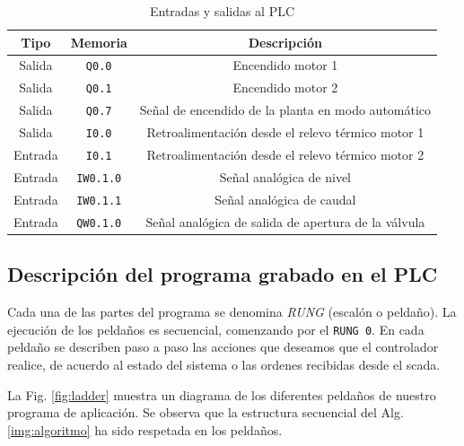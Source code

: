 \begin{table}[!t]

\renewcommand{\arraystretch}{1.3}
\centering
\begin{tabular}{c||c||c}
\hline
\bfseries Tipo & \bfseries Memoria & \bfseries Descripción\\
\hline \hline
Salida & \verb|Q0.0|  & Encendido motor 1\\
Salida & \verb|Q0.1|  & Encendido motor 2\\
Salida & \verb|Q0.7|  & Señal de encendido de la planta en modo automático\\
Salida & \verb|I0.0|  & Retroalimentación desde el relevo térmico motor 1\\
\hline
Entrada & \verb|I0.1|  & Retroalimentación desde el relevo térmico motor 2\\
Entrada & \verb|IW0.1.0|  & Señal analógica de nivel\\
Entrada & \verb|IW0.1.1|  & Señal analógica de caudal \\
Entrada & \verb|QW0.1.0|  & Señal analógica de salida de apertura de la válvula
\\
\hline
\end{tabular}
\caption{Entradas y salidas al PLC}
\label{table:entradassalidas}
\end{table}

\subsection{Descripción del programa grabado en el PLC}

Cada una de las partes del programa se denomina \emph{RUNG} (escalón o
peldaño).
La ejecución de los peldaños es secuencial, comenzando por el \verb|RUNG 0|.
En cada peldaño se describen paso a paso las acciones que deseamos que
el controlador realice, de acuerdo al estado del sistema o las ordenes
recibidas desde el \gls{scada}.

La Fig. \ref{fig:ladder} muestra un diagrama de los diferentes peldaños de
nuestro programa de aplicación.
Se observa que la estructura secuencial del Alg. \ref{img:algoritmo} ha
sido respetada en los peldaños.


